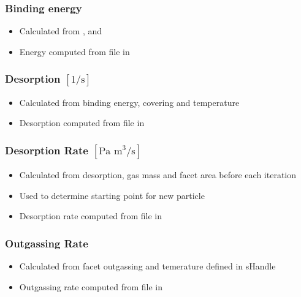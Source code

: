 \subsubsection{Binding energy}
\begin{itemize}[noitemsep,topsep=0pt, partopsep=0pt]
\item Calculated from ,  and 
\item Energy computed from  file in 
\end{itemize}

\subsubsection{Desorption $[1/\text{s}]$}
\begin{itemize}[noitemsep,topsep=0pt, partopsep=0pt]
\item Calculated from binding energy, covering and temperature
\item Desorption computed from  file in 
\end{itemize}

\subsubsection{Desorption Rate $[\text{Pa m}^3/\text{s}]$}
\begin{itemize}[noitemsep,topsep=0pt, partopsep=0pt]
\item Calculated from desorption, gas mass and facet area before each iteration
\item Used to determine starting point for new particle
\item Desorption rate computed from  file in 
\end{itemize}

\subsubsection{Outgassing Rate}
\begin{itemize}[noitemsep,topsep=0pt, partopsep=0pt]
\item Calculated from facet outgassing and temerature defined in sHandle
\item Outgassing rate computed from  file in 
\end{itemize}

